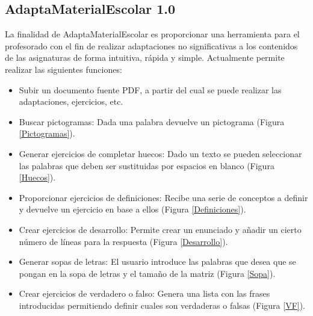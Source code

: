 \subsection{AdaptaMaterialEscolar 1.0}
\label{cap:adaptaMaterial}
La finalidad de AdaptaMaterialEscolar es proporcionar una herramienta para el profesorado con el fin de realizar adaptaciones no significativas a los contenidos de las asignaturas de forma intuitiva, rápida y simple. Actualmente permite realizar las siguientes funciones:
\begin{itemize}
    \item Subir un documento fuente PDF, a partir del cual se puede realizar las adaptaciones, ejercicios, etc.
    \item Buscar pictogramas: Dada una palabra devuelve un pictograma (Figura \ref{Pictogramas}).
    \item Generar ejercicios de completar huecos: Dado un texto se pueden seleccionar las palabras que deben ser sustituidas por espacios en blanco (Figura \ref{Huecos}).
    \item Proporcionar ejercicios de definiciones: Recibe una serie de conceptos a definir y devuelve un ejercicio en base a ellos (Figura \ref{Definiciones}).
    \item Crear ejercicios de desarrollo: Permite crear un enunciado y añadir un cierto número de líneas para la respuesta (Figura \ref{Desarrollo}).
    \item Generar sopas de letras: El usuario introduce las palabras que desea que se pongan en la sopa de letras y el tamaño de la matriz (Figura \ref{Sopa}).
    \item Crear ejercicios de verdadero o falso: Genera una lista con las frases introducidas permitiendo definir cuales son verdaderas o falsas (Figura \ref{VF}).
\end{itemize}

